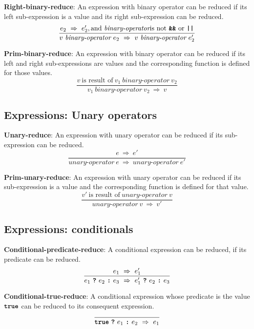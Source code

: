 \vspace{10mm}
\textbf{Right-binary-reduce}: An expression with binary operator
can be reduced if its left sub-expression is a value and its right
sub-expression can be reduced.
\[
\frac{
  e_2\ \Rightarrow\ e_2', \textrm{and}\ \textit{binary-operator}
  \mbox{is not}\ \textbf{\texttt{\&\&}}\ \textrm{or}\ \texttt{\textbf{||}}
}{
  v\  \textit{binary-operator} \ e_2
  \ \Rightarrow \ 
  v\  \textit{binary-operator} \ e_2'
}
\]

\vspace{10mm}
\textbf{Prim-binary-reduce}: An expression with binary operator
can be reduced if its left and right sub-expressions are values and
the corresponding function is defined for those values.
\[
\frac{
  v\ \mbox{is result of}\ v_1\  \textit{binary-operator} \ v_2
}{
  v_1\  \textit{binary-operator} \ v_2
  \ \Rightarrow \ 
  v
}
\]

\subsection*{Expressions: Unary operators}

\textbf{Unary-reduce}: An expression with unary operator
can be reduced if its sub-expression can be reduced.
\[
\frac{
  e \ \Rightarrow \ e'
}{
  \textit{unary-operator} \ e
  \ \Rightarrow \ 
  \textit{unary-operator} \ e'
}
\]

\vspace{10mm}
\textbf{Prim-unary-reduce}: An expression with unary operator
can be reduced if its sub-expression is a value and
the corresponding function is defined for that value.
\[
\frac{
  v'\ \mbox{is result of}\ \textit{unary-operator} \ v
}{
  \textit{unary-operator} \ v
  \ \Rightarrow \ 
  v'
}
\]

\subsection*{Expressions: conditionals}

\textbf{Conditional-predicate-reduce}: A conditional
expression can be reduced, if its predicate can be reduced.
\[
\frac{
  e_1 \ \Rightarrow \ e_1'
}{
  e_1\  \textbf{\texttt{?}}\ e_2\ \textbf{\texttt{:}}\ e_3
  \ \Rightarrow \ 
  e_1'\ \textbf{\texttt{?}}\ e_2\ \textbf{\texttt{:}}\ e_3
}
\]

\vspace{10mm}
\textbf{Conditional-true-reduce}: A conditional
expression whose predicate is the value
$\textbf{\texttt{true}}$
can be reduced to its consequent expression.
\[
\frac{
}{
  \textbf{\texttt{true}}\  \textbf{\texttt{?}}\ e_1\ \textbf{\texttt{:}}\ e_2
  \ \Rightarrow \ 
  e_1
}
\]

